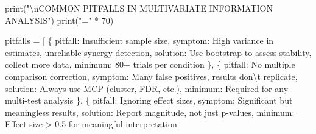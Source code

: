 \documentclass[
  11pt,
  letterpaper,
  oneside,
  openany]{book}
\newenvironment{Shaded}{\begin{snugshade}}{\end{snugshade}}
\newcommand{\BuiltInTok}[1]{\textcolor[rgb]{0.00,0.23,0.31}{#1}}
\newcommand{\CharTok}[1]{\textcolor[rgb]{0.13,0.47,0.30}{#1}}
\newcommand{\DecValTok}[1]{\textcolor[rgb]{0.68,0.00,0.00}{#1}}
\newcommand{\NormalTok}[1]{\textcolor[rgb]{0.00,0.23,0.31}{#1}}
\newcommand{\OperatorTok}[1]{\textcolor[rgb]{0.37,0.37,0.37}{#1}}
\newcommand{\StringTok}[1]{\textcolor[rgb]{0.13,0.47,0.30}{#1}}
\begin{document}
\begin{Shaded}
\begin{Highlighting}[]
\BuiltInTok{print}\NormalTok{(}\StringTok{"}\CharTok{\textbackslash{}n}\StringTok{COMMON PITFALLS IN MULTIVARIATE INFORMATION ANALYSIS"}\NormalTok{)}
\BuiltInTok{print}\NormalTok{(}\StringTok{"="} \OperatorTok{*} \DecValTok{70}\NormalTok{)}

\NormalTok{pitfalls }\OperatorTok{=}\NormalTok{ [}
\NormalTok{    \{}
        \StringTok{\textquotesingle{}pitfall\textquotesingle{}}\NormalTok{: }\StringTok{\textquotesingle{}Insufficient sample size\textquotesingle{}}\NormalTok{,}
        \StringTok{\textquotesingle{}symptom\textquotesingle{}}\NormalTok{: }\StringTok{\textquotesingle{}High variance in estimates, unreliable synergy detection\textquotesingle{}}\NormalTok{,}
        \StringTok{\textquotesingle{}solution\textquotesingle{}}\NormalTok{: }\StringTok{\textquotesingle{}Use bootstrap to assess stability, collect more data\textquotesingle{}}\NormalTok{,}
        \StringTok{\textquotesingle{}minimum\textquotesingle{}}\NormalTok{: }\StringTok{\textquotesingle{}80+ trials per condition\textquotesingle{}}
\NormalTok{    \},}
\NormalTok{    \{}
        \StringTok{\textquotesingle{}pitfall\textquotesingle{}}\NormalTok{: }\StringTok{\textquotesingle{}No multiple comparison correction\textquotesingle{}}\NormalTok{,}
        \StringTok{\textquotesingle{}symptom\textquotesingle{}}\NormalTok{: }\StringTok{\textquotesingle{}Many false positives, results don}\CharTok{\textbackslash{}\textquotesingle{}}\StringTok{t replicate\textquotesingle{}}\NormalTok{,}
        \StringTok{\textquotesingle{}solution\textquotesingle{}}\NormalTok{: }\StringTok{\textquotesingle{}Always use MCP (cluster, FDR, etc.)\textquotesingle{}}\NormalTok{,}
        \StringTok{\textquotesingle{}minimum\textquotesingle{}}\NormalTok{: }\StringTok{\textquotesingle{}Required for any multi{-}test analysis\textquotesingle{}}
\NormalTok{    \},}
\NormalTok{    \{}
        \StringTok{\textquotesingle{}pitfall\textquotesingle{}}\NormalTok{: }\StringTok{\textquotesingle{}Ignoring effect sizes\textquotesingle{}}\NormalTok{,}
        \StringTok{\textquotesingle{}symptom\textquotesingle{}}\NormalTok{: }\StringTok{\textquotesingle{}Significant but meaningless results\textquotesingle{}}\NormalTok{,}
        \StringTok{\textquotesingle{}solution\textquotesingle{}}\NormalTok{: }\StringTok{\textquotesingle{}Report magnitude, not just p{-}values\textquotesingle{}}\NormalTok{,}
        \StringTok{\textquotesingle{}minimum\textquotesingle{}}\NormalTok{: }\StringTok{\textquotesingle{}Effect size \textgreater{} 0.5 for meaningful interpretation\textquotesingle{}}

\end{Highlighting}
\end{Shaded}
\end{document}
